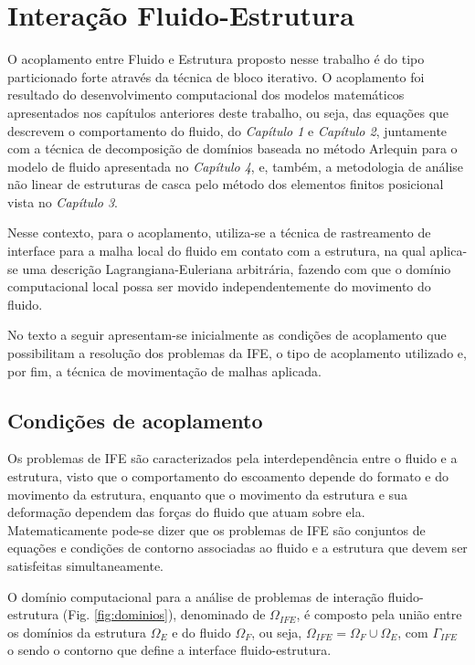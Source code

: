 \documentclass[tese_patricia]{subfiles}
\begin{document}
\chapter[Acoplamento Fluido-Estrutura]{Interação Fluido-Estrutura} \label{capitulo:Cap5}

 O acoplamento entre Fluido e Estrutura proposto nesse trabalho é do tipo particionado forte através da técnica de bloco iterativo. O acoplamento foi resultado do desenvolvimento computacional dos modelos matemáticos apresentados nos capítulos anteriores deste trabalho, ou seja, das equações que descrevem o comportamento do fluido, do \textit{Capítulo 1} e \textit{Capítulo 2}, juntamente com a técnica de decomposição de domínios baseada no método Arlequin para o modelo de fluido apresentada no \textit{Capítulo 4}, e,  também, a metodologia de análise não linear de estruturas de casca pelo método dos elementos finitos posicional vista no \textit{Capítulo 3}.
 
 Nesse contexto, para o acoplamento, utiliza-se a técnica de rastreamento de interface para a malha local do fluido em contato com a estrutura, na qual aplica-se uma descrição Lagrangiana-Euleriana arbitrária, fazendo com que o domínio computacional local possa ser movido independentemente do movimento do fluido. 
 
 No texto a seguir apresentam-se inicialmente as condições de acoplamento que possibilitam a resolução dos problemas da IFE, o tipo de acoplamento utilizado e, por fim, a técnica de movimentação de malhas aplicada.

\section{Condições de acoplamento}

Os problemas de IFE são caracterizados pela interdependência entre o fluido e a estrutura, visto que o comportamento do escoamento depende do formato e do movimento da estrutura, enquanto que o movimento da estrutura e sua deformação dependem das forças do fluido que atuam sobre ela. Matematicamente pode-se dizer que os problemas de IFE são conjuntos de equações e condições de contorno associadas ao fluido e a estrutura que devem ser satisfeitas simultaneamente.

O domínio computacional para a análise de problemas de interação fluido-estrutura (Fig. \ref{fig:dominios}), denominado de $\Omega_{IFE}$, é composto pela união entre os domínios da estrutura $\Omega_E$ e do fluido $\Omega_F$, ou seja, $\Omega_{IFE} = \Omega_F \cup \Omega_E$, com $\Gamma_{IFE}$ o sendo o contorno que define a interface fluido-estrutura.
\end{document}
